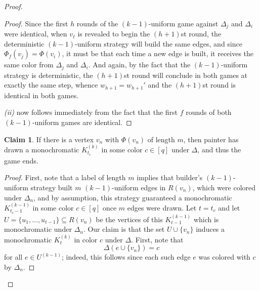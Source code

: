 \documentclass[A4paper,reqno,oneside,12pt]{amsart}
\theoremstyle{plain}
\theoremstyle{definition}
\newtheorem{claim}[theorem]{Claim}
\def\l{\ell}
\begin{document}
\begin{proof}
\begin{proof}
    Since the first $h$ rounds of the $(k-1)$-uniform game against $\Delta_j$ and $\Delta_i$ were identical, when $v_\l$ is revealed to begin the $(h+1)$st round, the deterministic $(k-1)$-uniform strategy will build the same edges, and since $\Phi_f(v_j) = \Phi(v_i)$, it must be that each time a new edge is built, it receives the same color from $\Delta_j$ and $\Delta_i$.
    And again, by the fact that the $(k-1)$-uniform strategy is deterministic, the $(h+1)$st round will conclude in both games at exactly the same step, whence $w_{h+1}=w_{h+1}'$ and the $(h+1)$st round is identical in both games.

    {\it (ii)} now follows immediately from the fact that the first $f$ rounds of both $(k-1)$-uniform games are identical.
\end{proof}

\begin{claim}
\label{clm: endgame}
    If there is a vertex $v_n$ with $\Phi(v_n)$ of length $m$, then painter has drawn a monochromatic $K_{t_c}^{(k)}$ in some color $c \in [q]$ under $\Delta$, and thus the game ends.
\end{claim}

\begin{proof}
    First, note that a label of length $m$ implies that builder's $(k-1)$-uniform strategy built $m$ $(k-1)$-uniform edges in $R(v_n)$, which were colored under $\Delta_n$, and by assumption, this strategy guaranteed a monochromatic $K_{t_c-1}^{(k-1)}$ in some color $c \in [q]$ once $m$ edges were drawn.
    Let $t=t_c$ and let $U = \{u_1, \dots, u_{t-1}\} \subseteq R(v_n)$ be the vertices of this $K_{t-1}^{(k-1)}$ which is monochromatic under $\Delta_n$.
    Our claim is that the set $U \cup \{v_n\}$ induces a monochromatic $K_t^{(k)}$ in color $c$ under $\Delta$.
    First, note that 
    \begin{equation*}
        \Delta(e \cup \{v_n\}) = c
    \end{equation*}
    for all $e \in U^{(k-1)}$;
    indeed, this follows since each such edge $e$ was colored with $c$ by $\Delta_n$.


\end{proof}
\end{proof}
\end{document}
